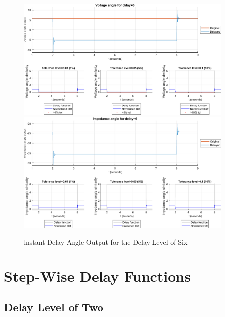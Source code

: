 \begin{figure}
    \caption{Instant Delay Angle Output for the Delay Level of Six}
    \includegraphics[width=0.95\textwidth]{PMUsim-figures/DelayOf_6/Instant_vAngle.png}    
    \includegraphics[width=0.95\textwidth]{PMUsim-figures/DelayOf_6/Instant_iAngle.png}    
    \label{fig:PMUsim_Six_Angle}
        \begin{small}
     \end{small}
\end{figure}


\section{Step-Wise Delay Functions}
\newpage \subsection{Delay Level of Two}
